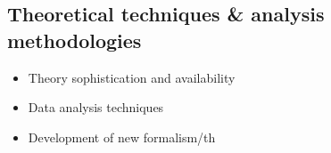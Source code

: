 \subsection{Theoretical techniques \& analysis methodologies}

\begin{itemize}
\item Theory sophistication and availability
\item Data analysis techniques
\item Development of new formalism/th
\end{itemize}